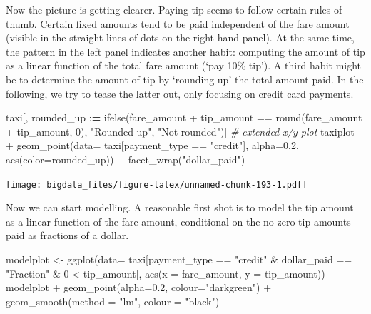 \documentclass[
  12pt,
]{style/krantz}
\newenvironment{Shaded}{\begin{snugshade}}{\end{snugshade}}
\newcommand{\AttributeTok}[1]{\textcolor[rgb]{0.77,0.63,0.00}{#1}}
\newcommand{\CommentTok}[1]{\textcolor[rgb]{0.56,0.35,0.01}{\textit{#1}}}
\newcommand{\DecValTok}[1]{\textcolor[rgb]{0.00,0.00,0.81}{#1}}
\newcommand{\ErrorTok}[1]{\textcolor[rgb]{0.64,0.00,0.00}{\textbf{#1}}}
\newcommand{\FloatTok}[1]{\textcolor[rgb]{0.00,0.00,0.81}{#1}}
\newcommand{\FunctionTok}[1]{\textcolor[rgb]{0.00,0.00,0.00}{#1}}
\newcommand{\NormalTok}[1]{#1}
\newcommand{\OtherTok}[1]{\textcolor[rgb]{0.56,0.35,0.01}{#1}}
\newcommand{\SpecialCharTok}[1]{\textcolor[rgb]{0.00,0.00,0.00}{#1}}
\newcommand{\StringTok}[1]{\textcolor[rgb]{0.31,0.60,0.02}{#1}}
\begin{document}
Now the picture is getting clearer. Paying tip seems to follow certain rules of thumb. Certain fixed amounts tend to be paid independent of the fare amount (visible in the straight lines of dots on the right-hand panel). At the same time, the pattern in the left panel indicates another habit: computing the amount of tip as a linear function of the total fare amount (`pay 10\% tip'). A third habit might be to determine the amount of tip by `rounding up' the total amount paid. In the following, we try to tease the latter out, only focusing on credit card payments.

\begin{Shaded}
\begin{Highlighting}[]
\NormalTok{taxi[, rounded\_up }\SpecialCharTok{:}\ErrorTok{=} \FunctionTok{ifelse}\NormalTok{(fare\_amount }\SpecialCharTok{+}\NormalTok{ tip\_amount }\SpecialCharTok{==} \FunctionTok{round}\NormalTok{(fare\_amount }\SpecialCharTok{+}\NormalTok{ tip\_amount, }\DecValTok{0}\NormalTok{),}
                            \StringTok{"Rounded up"}\NormalTok{,}
                            \StringTok{"Not rounded"}\NormalTok{)]}
\CommentTok{\# extended x/y plot}
\NormalTok{taxiplot }\SpecialCharTok{+}
     \FunctionTok{geom\_point}\NormalTok{(}\AttributeTok{data=}\NormalTok{ taxi[payment\_type }\SpecialCharTok{==} \StringTok{"credit"}\NormalTok{],}
                \AttributeTok{alpha=}\FloatTok{0.2}\NormalTok{, }\FunctionTok{aes}\NormalTok{(}\AttributeTok{color=}\NormalTok{rounded\_up)) }\SpecialCharTok{+}
     \FunctionTok{facet\_wrap}\NormalTok{(}\StringTok{"dollar\_paid"}\NormalTok{)}
\end{Highlighting}
\end{Shaded}

\texttt{[image: bigdata\_files/figure-latex/unnamed-chunk-193-1.pdf]}

Now we can start modelling. A reasonable first shot is to model the tip amount as a linear function of the fare amount, conditional on the no-zero tip amounts paid as fractions of a dollar.

\begin{Shaded}
\begin{Highlighting}[]
\NormalTok{modelplot }\OtherTok{\textless{}{-}} \FunctionTok{ggplot}\NormalTok{(}\AttributeTok{data=}\NormalTok{ taxi[payment\_type }\SpecialCharTok{==} \StringTok{"credit"} \SpecialCharTok{\&}\NormalTok{ dollar\_paid }\SpecialCharTok{==} \StringTok{"Fraction"} \SpecialCharTok{\&} \DecValTok{0} \SpecialCharTok{\textless{}}\NormalTok{ tip\_amount],}
                    \FunctionTok{aes}\NormalTok{(}\AttributeTok{x =}\NormalTok{ fare\_amount, }\AttributeTok{y =}\NormalTok{ tip\_amount))}
\NormalTok{modelplot }\SpecialCharTok{+}
     \FunctionTok{geom\_point}\NormalTok{(}\AttributeTok{alpha=}\FloatTok{0.2}\NormalTok{, }\AttributeTok{colour=}\StringTok{"darkgreen"}\NormalTok{) }\SpecialCharTok{+}
     \FunctionTok{geom\_smooth}\NormalTok{(}\AttributeTok{method =} \StringTok{"lm"}\NormalTok{, }\AttributeTok{colour =} \StringTok{"black"}\NormalTok{)}
\end{Highlighting}
\end{Shaded}
\end{document}
